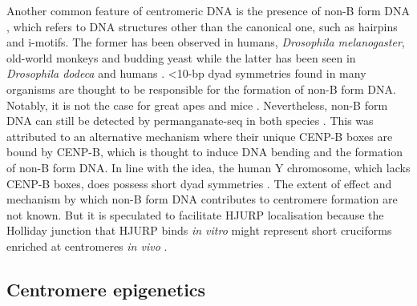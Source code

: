 Another common feature of centromeric DNA is the presence of non-B form DNA \citep{Kasinathan2018Non-B-FormCentromeres}, which refers to DNA structures other than the canonical one, such as hairpins and i-motifs. The former has been observed in humans, \textit{Drosophila melanogaster}, old-world monkeys and budding yeast while the latter has been seen in \textit{Drosophila dodeca} and humans \citep{Koch2000NeocentromeresDNA, Ferrer1995CentromericStructures, Catasti1994UnusualCentromeres}. <10-bp dyad symmetries found in many organisms are thought to be responsible for the formation of non-B form DNA. Notably, it is not the case for great apes and mice \citep{Kasinathan2018Non-B-FormCentromeres}. Nevertheless, non-B form DNA can still be detected by permanganate-seq in both species \citep{Kouzine2017Permanganate/S1Genome, Kouzine2013GlobalLymphocytes}. This was attributed to an alternative mechanism where their unique CENP-B boxes are bound by CENP-B, which is thought to induce DNA bending and the formation of non-B form DNA. In line with the idea, the human Y chromosome, which lacks CENP-B boxes, does possess short dyad symmetries \citep{Kasinathan2018Non-B-FormCentromeres}. The extent of effect and mechanism by which non-B form DNA contributes to centromere formation are not known. But it is speculated to facilitate HJURP localisation because the Holliday junction that HJURP binds \textit{in vitro} \citep{Kato2007ActivationCells} might represent short cruciforms enriched at centromeres \textit{in vivo} \citep{Kasinathan2018Non-B-FormCentromeres}. 


\subsection{Centromere epigenetics}

